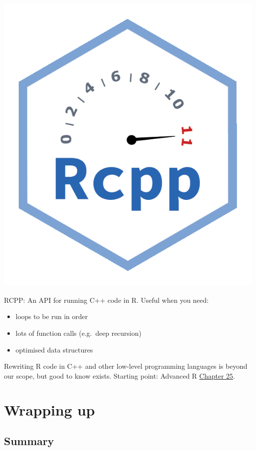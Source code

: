 \documentclass[
  letterpaper,
  DIV=11,
  numbers=noendperiod]{scrreprt}
\providecommand{\tightlist}{%
  \setlength{\itemsep}{0pt}\setlength{\parskip}{0pt}}\usepackage{longtable,booktabs,array}
\begin{document}
\includegraphics{images/403-production-scalability/Rccp.png}

RCPP: An API for running C++ code in R. Useful when you need:

\begin{itemize}
\tightlist
\item
  loops to be run in order
\item
  lots of function calls (e.g.~deep recursion)
\item
  optimised data structures
\end{itemize}

Rewriting R code in C++ and other low-level programming languages is
beyond our scope, but good to know exists. Starting point: Advanced R
\href{https://adv-r.hadley.nz/rcpp.html}{Chapter 25}.

\section{Wrapping up}\label{wrapping-up-7}

\subsection*{Summary}\label{summary-2}
\end{document}
